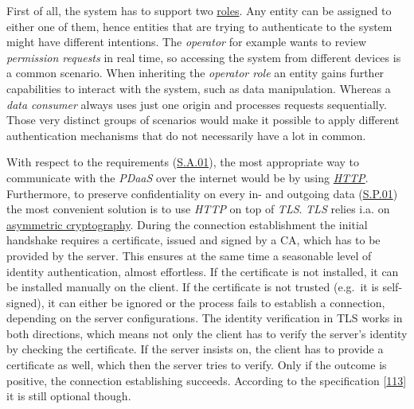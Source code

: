 \documentclass[12pt,english,a4paper,titlepage,cleardoublepage=empty,dottedtoc]{report}
\begin{document}
First of all, the system has to support two
\protect\hyperlink{sa03}{roles}. Any entity can be assigned to either
one of them, hence entities that are trying to authenticate to the
system might have different intentions. The \emph{operator} for example
wants to review \emph{permission requests} in real time, so accessing
the system from different devices is a common scenario. When inheriting
the \emph{operator role} an entity gains further capabilities to
interact with the system, such as data manipulation. Whereas a
\emph{data consumer} always uses just one origin and processes requests
sequentially. Those very distinct groups of scenarios would make it
possible to apply different authentication mechanisms that do not
necessarily have a lot in common.

With respect to the requirements (\protect\hyperlink{sa01}{S.A.01}), the
most appropriate way to communicate with the \emph{PDaaS} over the
internet would be by using \emph{\protect\hyperlink{link_http}{HTTP}}.
Furthermore, to preserve confidentiality on every in- and outgoing data
(\protect\hyperlink{sp01}{S.P.01}) the most convenient solution is to
use \emph{HTTP} on top of \emph{TLS}. \emph{TLS} relies i.a. on
\protect\hyperlink{link_asym-crypto}{asymmetric cryptography}. During
the connection establishment the initial handshake requires a
certificate, issued and signed by a CA, which has to be provided by the
server. This ensures at the same time a seasonable level of identity
authentication, almost effortless. If the certificate is not installed,
it can be installed manually on the client. If the certificate is not
trusted (e.g.~it is self-signed), it can either be ignored or the
process fails to establish a connection, depending on the server
configurations. The identity verification in TLS works in both
directions, which means not only the client has to verify the server's
identity by checking the certificate. If the server insists on, the
client has to provide a certificate as well, which then the server tries
to verify. Only if the outcome is positive, the connection establishing
succeeds. According to the specification
{[}\protect\hyperlink{ref-web_spec_tls-12_client-auth}{113}{]} it is
still optional though.
\end{document}
